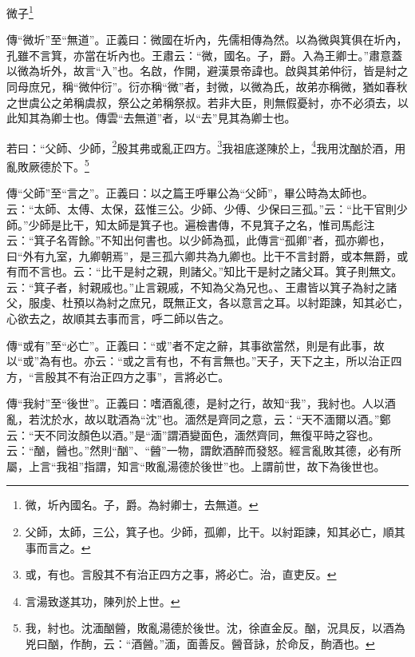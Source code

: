 微子\footnote{微，圻內國名。子，爵。為紂卿士，去無道。}

{\noindent\zhuan{}\fzbyks 傳“微圻”至“無道”。正義曰：微國在圻內，先儒相傳為然。以為微與箕俱在圻內，孔雖不言箕，亦當在圻內也。王肅云：“微，國名。子，爵。入為王卿士。”肅意蓋以微為圻外，故言“入”也。名啟，作開，避漢景帝諱也。啟與其弟仲衍，皆是紂之同母庶兄，稱“微仲衍”。衍亦稱“微”者，封微，以微為氏，故弟亦稱微，猶如春秋之世虞公之弟稱虞叔，祭公之弟稱祭叔。若非大臣，則無假憂紂，亦不必須去，以此知其為卿士也。傳雲“去無道”者，以“去”見其為卿士也。 \par}

若曰：“父師、少師，\footnote{父師，太師，三公，箕子也。少師，孤卿，比干。以紂距諫，知其必亡，順其事而言之。}殷其弗或亂正四方。\footnote{或，有也。言殷其不有治正四方之事，將必亡。治，直吏反。}我祖底遂陳於上，\footnote{言湯致遂其功，陳列於上世。}我用沈酗於酒，用亂敗厥德於下。\footnote{我，紂也。沈湎酗醟，敗亂湯德於後世。沈，徐直金反。酗，況具反，以酒為兇曰酗，作䣱，云：“酒醟。”湎，面善反。醟音詠，於命反，䣱酒也。}


{\noindent\zhuan{}\fzbyks 傳“父師”至“言之”。正義曰：以之篇王呼畢公為“父師”，畢公時為太師也。云：“太師、太傅、太保，茲惟三公。少師、少傅、少保曰三孤。”云：“比干官則少師。”少師是比干，知太師是箕子也。遍檢書傳，不見箕子之名，惟司馬彪注云：“箕子名胥餘。”不知出何書也。以少師為孤，此傳言“孤卿”者，孤亦卿也，曰“外有九室，九卿朝焉”，是三孤六卿共為九卿也。比干不言封爵，或本無爵，或有而不言也。云：“比干是紂之親，則諸父。”知比干是紂之諸父耳。箕子則無文。云：“箕子者，紂親戚也。”止言親戚，不知為父為兄也。、王肅皆以箕子為紂之諸父，服虔、杜預以為紂之庶兄，既無正文，各以意言之耳。以紂距諫，知其必亡，心欲去之，故順其去事而言，呼二師以告之。 \par}

{\noindent\zhuan{}\fzbyks 傳“或有”至“必亡”。正義曰：“或”者不定之辭，其事欲當然，則是有此事，故以“或”為有也。亦云：“或之言有也，不有言無也。”天子，天下之主，所以治正四方，“言殷其不有治正四方之事”，言將必亡。 \par}

{\noindent\zhuan{}\fzbyks 傳“我紂”至“後世”。正義曰：嗜酒亂德，是紂之行，故知“我”，我紂也。人以酒亂，若沈於水，故以耽酒為“沈”也。湎然是齊同之意，云：“天不湎爾以酒。”鄭云：“天不同汝顏色以酒。”是“湎”謂酒變面色，湎然齊同，無復平時之容也。云：“酗，醟也。”然則“酗”、“醟”一物，謂飲酒醉而發怒。經言亂敗其德，必有所屬，上言“我祖”指謂，知言“敗亂湯德於後世”也。上謂前世，故下為後世也。 \par}

